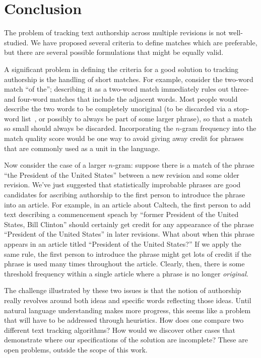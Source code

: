 \section{Conclusion}

The problem of tracking text authorship across multiple revisions
is not well-studied.
We have proposed several criteria to define matches which
are preferable, but there are several possible formulations
that might be equally valid.

A significant problem in defining the criteria for a
good solution to tracking authorship is the handling of short matches.
For example, consider the two-word match ``of the''; describing
it as a two-word match immediately rules out three- and four-word
matches that include the adjacent words.
Most people would describe the two words to be completely
unoriginal (to be discarded via a stop-word list~\cite{Kinzler2011},
or possibly to always be part of some larger phrase),
so that a match so small should always be discarded.
Incorporating the $n$-gram frequency into the match quality
score would be one way to avoid giving away credit for phrases that
are commonly used as a unit in the language.

Now consider the case of a larger $n$-gram: suppose there is a match
of the phrase ``the President of the United States'' between a new
revision and some older revision.
We've just suggested that statistically improbable phrases are
good candidates for ascribing authorship to the first person to
introduce the phrase into an article.
For example, in an article about Caltech, the first person to
add text describing a commencement speach by ``former President of
the United States, Bill Clinton'' should certainly get credit for
any appearance of the phrase ``President of the United States''
in later revisions.
What about when this phrase appears in an article titled
``President of the United States?''
If we apply the same rule, the first person to introduce the phrase
might get lots of credit if the phrase is used many times throughout
the article.
Clearly, then, there is some threshold frequency within a single
article where a phrase is no longer \textit{original}.

The challenge illustrated by these two issues is that the notion
of authorship really revolves around both ideas and specific
words reflecting those ideas.
Until natural language understanding makes more progress, this seems
like a problem that will have to be addressed through heuristics.
How does one compare two different text tracking algorithms?
How would we discover other cases that demonstrate where our
specifications of the solution are incomplete?
These are open problems, outside the scope of this work.

